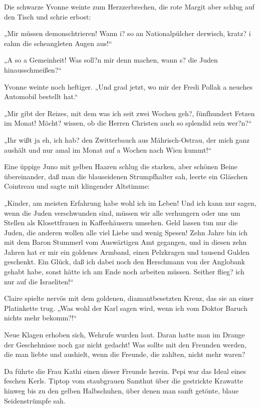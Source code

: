 Die schwarze Yvonne weinte zum Herzzerbrechen, die rote Margit aber
schlug auf den Tisch und schrie erbost:

„Mir müssen demonschtrieren! Wann i? so an Nationalpülcher
derwisch, kratz? i eahm die scheangleten Augen aus!“

„A so a Gemeinheit! Was soll?n mir denn machen, wann s? die Juden
hinausschmeißen?“

Yvonne weinte noch heftiger. „Und grad jetzt, wo mir der Fredi
Pollak a neuches Automobil bestellt hat.“

„Mir gibt der Reizes, mit dem was ich seit zwei Wochen geh?,
fünfhundert Fetzen im Monat! Möcht? wissen, ob die Herren Christen
auch so splendid sein wer?n?“

„Ihr wißt ja eh, ich hab? den Zwitterbauch aus Mährisch-Ostrau, der
mich ganz aushält und nur amal im Monat auf a Wochen nach Wien
kummt!“

Eine üppige Juno mit gelben Haaren schlug die starken, aber schönen
Beine übereinander, daß man die blauseidenen Strumpfhalter sah,
leerte ein Gläschen Cointreau und sagte mit klingender Altstimme:

„Kinder, am meisten Erfahrung habe wohl ich im Leben! Und ich kann
nur sagen, wenn die Juden verschwunden sind, müssen wir alle
verhungern oder uns um Stellen als Klosettfrauen in Kaffeehäusern
umsehen. Geld lassen tun nur die Juden, die anderen wollen alle
viel Liebe und wenig Spesen! Zehn Jahre bin ich mit dem
 Baron Stummerl vom Auswärtigen Amt gegangen, und in
diesen zehn Jahren hat er mir ein goldenes Armband, einen
Pelzkragen und tausend Gulden geschenkt. Ein Glück, daß ich dabei
noch den Herschmann von der Anglobank gehabt habe, sonst hätte ich
am Ende noch arbeiten müssen. Seither flieg? ich nur auf die
Israeliten!“

Claire spielte nervös mit dem goldenen, diamantbesetzten Kreuz, das
sie an einer Platinkette trug. „Was wohl der Karl sagen wird, wenn
ich vom Doktor Baruch nichts mehr bekomm?!“

Neue Klagen erhoben sich, Wehrufe wurden laut. Daran hatte man im
Drange der Geschehnisse noch gar nicht gedacht! Was sollte mit den
Freunden werden, die man liebte und aushielt, wenn die Freunde, die
zahlten, nicht mehr waren?

Da führte die Frau Kathi einen dieser Freunde herein. Pepi war das
Ideal eines feschen Kerls. Tiptop vom staubgrauen Samthut über die
gestrickte Krawatte hinweg bis zu den gelben Halbschuhen, über
denen man sanft getönte, blaue Seidenstrümpfe sah.

